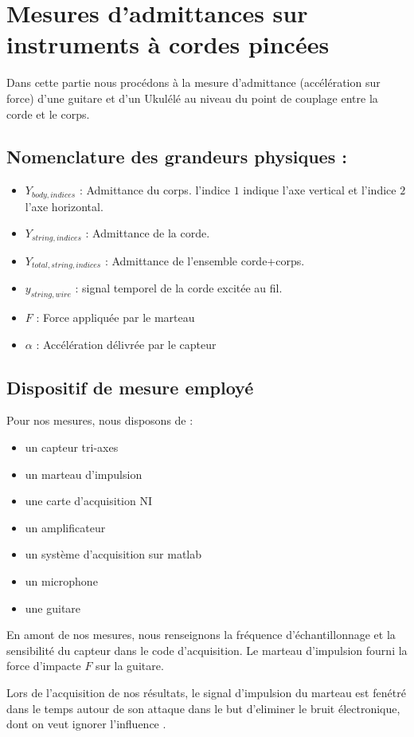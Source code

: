 \chapter{Mesures d'admittances sur instruments à cordes pincées}
Dans cette partie nous procédons à la mesure d'admittance (accélération sur force) d'une guitare et d'un Ukulélé au niveau du point de couplage entre la corde et le corps.
\section{Nomenclature des grandeurs physiques :} 
\begin{itemize}
\item $Y_{body,indices}$ : Admittance du corps. l'indice $1$ indique l'axe vertical et l'indice $2$ l'axe horizontal.
\item $Y_{string,indices}$ : Admittance de la corde.
\item $Y_{total,string,indices}$ : Admittance de l'ensemble corde+corps.
\item $y_{string,wire}$ : signal temporel de la corde excitée au fil.
\item $F$ : Force appliquée par le marteau 
\item $\alpha$ : Accélération délivrée par le capteur 
\end{itemize}

\section{Dispositif de mesure employé}
Pour nos mesures, nous disposons de :
\begin{itemize}
\item un capteur tri-axes
\item un marteau d'impulsion
\item une carte d'acquisition NI
\item un amplificateur
\item un système d'acquisition sur matlab
\item un microphone
\item une guitare
\end{itemize}
En amont de nos mesures, nous renseignons la fréquence d'échantillonnage et la sensibilité du capteur dans le code d'acquisition. Le marteau d'impulsion fourni la force d'impacte $F$ sur la guitare. 

Lors de l'acquisition de nos résultats, le signal d'impulsion du marteau est fenétré dans le temps autour de son attaque dans le but d'eliminer le bruit électronique, dont on veut ignorer l'influence . 

